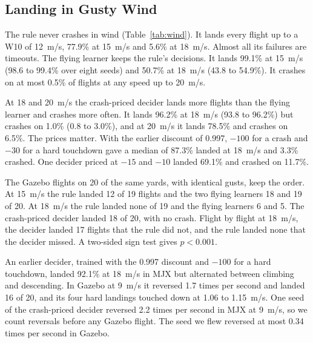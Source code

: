 \subsection{Landing in Gusty Wind}

The rule never crashes in wind (Table~\ref{tab:wind}). It lands every flight up to a W10 of 12~m/s, 77.9\% at 15~m/s and 5.6\% at 18~m/s. Almost all its failures are timeouts. The flying learner keeps the rule's decisions. It lands 99.1\% at 15~m/s (98.6 to 99.4\% over eight seeds) and 50.7\% at 18~m/s (43.8 to 54.9\%). It crashes on at most 0.5\% of flights at any speed up to 20~m/s.

At 18 and 20~m/s the crash-priced decider lands more flights than the flying learner and crashes more often. It lands 96.2\% at 18~m/s (93.8 to 96.2\%) but crashes on 1.0\% (0.8 to 3.0\%), and at 20~m/s it lands 78.5\% and crashes on 6.5\%. The prices matter. With the earlier discount of 0.997, $-100$ for a crash and $-30$ for a hard touchdown gave a median of 87.3\% landed at 18~m/s and 3.3\% crashed. One decider priced at $-15$ and $-10$ landed 69.1\% and crashed on 11.7\%.

The Gazebo flights on 20 of the same yards, with identical gusts, keep the order. At 15~m/s the rule landed 12 of 19 flights and the two flying learners 18 and 19 of 20. At 18~m/s the rule landed none of 19 and the flying learners 6 and 5. The crash-priced decider landed 18 of 20, with no crash. Flight by flight at 18~m/s, the decider landed 17 flights that the rule did not, and the rule landed none that the decider missed. A two-sided sign test gives $p < 0.001$.

An earlier decider, trained with the 0.997 discount and $-100$ for a hard touchdown, landed 92.1\% at 18~m/s in MJX but alternated between climbing and descending. In Gazebo at 9~m/s it reversed 1.7 times per second and landed 16 of 20, and its four hard landings touched down at 1.06 to 1.15~m/s. One seed of the crash-priced decider reversed 2.2 times per second in MJX at 9~m/s, so we count reversals before any Gazebo flight. The seed we flew reversed at most 0.34 times per second in Gazebo.
